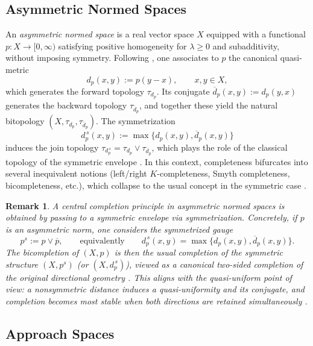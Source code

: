 \documentclass[preprint,12pt]{elsarticle}
\newtheorem{remark}[theorem]{Remark}
\begin{document}
\subsection{Asymmetric Normed Spaces}\label{ssec:an}

An \emph{asymmetric normed space} is a real vector space $X$ equipped
with a functional $p:X\to[0,\infty)$ satisfying positive homogeneity for
$\lambda\ge 0$ and subadditivity, without imposing symmetry. Following
\cite{Cobzas2006,Cobzas2013,CobzasSurvey}, one associates to $p$ the
canonical quasi-metric
\[
d_p(x,y):=p(y-x),\qquad x,y\in X,
\]
which generates the forward topology $\tau_{d_p}$. Its conjugate
$\overline d_p(x,y):=d_p(y,x)$ generates the backward topology
$\tau_{\overline d_p}$, and together these yield the natural bitopology
$(X,\tau_{d_p},\tau_{\overline d_p})$. The symmetrization
\[
d_p^{\,s}(x,y):=\max\{d_p(x,y),\overline d_p(x,y)\}
\]
induces the join topology
$\tau_{d_p^{\,s}}=\tau_{d_p}\vee\tau_{\overline d_p}$, which plays the
role of the classical topology of the symmetric envelope
\cite{Cobzas2013,CobzasSurvey}. In this context, completeness bifurcates
into several inequivalent notions (left/right $K$-completeness, Smyth
completeness, bicompleteness, etc.), which collapse to the usual concept
in the symmetric case \cite{CobzasSurvey}.

\begin{remark}\label{rem:an:bicompletion-envelope}
A central completion principle in asymmetric normed spaces is obtained
by passing to a \emph{symmetric envelope} via symmetrization. Concretely,
if $p$ is an asymmetric norm, one considers the symmetrized gauge
\[
p^{s}:=p\vee \overline p,
\qquad\text{equivalently}\qquad
d_{p}^{\,s}(x,y)=\max\{d_p(x,y),\overline d_p(x,y)\}.
\]
The bicompletion of $(X,p)$ is then the usual completion of the symmetric
structure $(X,p^{s})$ (or $(X,d_p^{\,s})$), viewed as a canonical
two-sided completion of the original directional geometry
\cite{Cobzas2013,CobzasSurvey}. This aligns with the quasi-uniform point
of view: a nonsymmetric distance induces a quasi-uniformity and its
conjugate, and completion becomes most stable when both directions are
retained simultaneously \cite{Kunzi2001}.
\end{remark}

\subsection{Approach Spaces}\label{ssec:approach}
\end{document}

